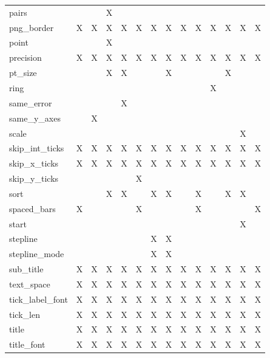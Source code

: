 {\begin{table}
\begin{tabular}{|l|c|c|c|c|c|c|c|c|c|c|c|c|c|}
pairs                  &   &   & X &   &   &   &   &   &   &   &   &   &   \\
png\_border            & X & X & X & X & X & X & X & X & X & X & X & X & X \\
point                  &   &   & X &   &   &   &   &   &   &   &   &   &   \\
precision              & X & X & X & X & X & X & X & X & X & X & X & X & X \\
pt\_size               &   &   & X & X &   &   & X &   &   &   & X &   &   \\
ring                   &   &   &   &   &   &   &   &   &   & X &   &   &   \\
same\_error            &   &   &   & X &   &   &   &   &   &   &   &   &   \\
same\_y\_axes          &   & X &   &   &   &   &   &   &   &   &   &   &   \\
scale                  &   &   &   &   &   &   &   &   &   &   &   & X &   \\
skip\_int\_ticks       & X & X & X & X & X & X & X & X & X & X & X & X & X \\
skip\_x\_ticks         & X & X & X & X & X & X & X & X & X & X & X & X & X \\
skip\_y\_ticks         &   &   &   &   & X &   &   &   &   &   &   &   &   \\
sort                   &   &   & X & X &   & X & X &   & X &   & X & X &   \\
spaced\_bars           & X &   &   &   & X &   &   &   & X &   &   &   & X \\
start                  &   &   &   &   &   &   &   &   &   &   &   & X &   \\
stepline               &   &   &   &   &   & X & X &   &   &   &   &   &   \\
stepline\_mode         &   &   &   &   &   & X & X &   &   &   &   &   &   \\
sub\_title             & X & X & X & X & X & X & X & X & X & X & X & X & X \\
text\_space            & X & X & X & X & X & X & X & X & X & X & X & X & X \\
tick\_label\_font      & X & X & X & X & X & X & X & X & X & X & X & X & X \\
tick\_len              & X & X & X & X & X & X & X & X & X & X & X & X & X \\
title                  & X & X & X & X & X & X & X & X & X & X & X & X & X \\
title\_font            & X & X & X & X & X & X & X & X & X & X & X & X & X \\

\end{tabular}
\end{table}}
